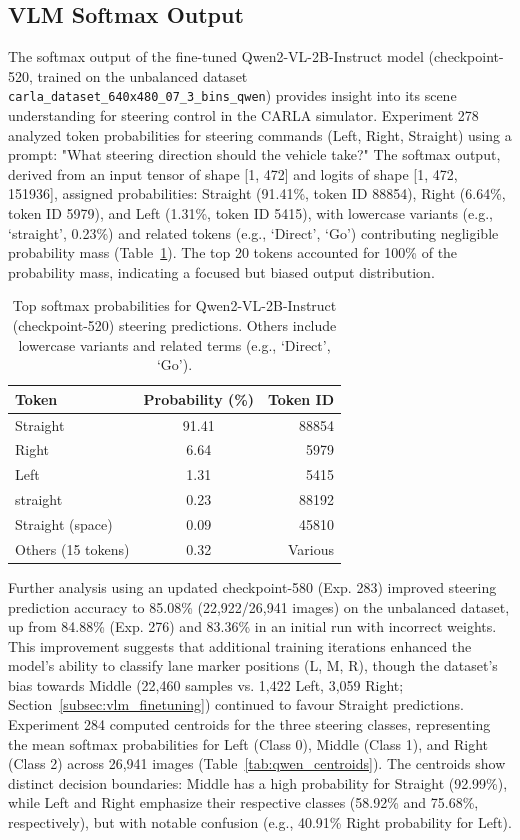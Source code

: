\subsection{VLM Softmax Output}
\label{subsec:vlm_softmax}

The softmax output of the fine-tuned Qwen2-VL-2B-Instruct model (checkpoint-520, trained on the unbalanced dataset \texttt{carla\_dataset\_640x480\_07\_3\_bins\_qwen}) provides insight into its scene understanding for steering control in the CARLA simulator. Experiment 278 analyzed token probabilities for steering commands (Left, Right, Straight) using a prompt: "What steering direction should the vehicle take?" The softmax output, derived from an input tensor of shape [1, 472] and logits of shape [1, 472, 151936], assigned probabilities: Straight (91.41\%, token ID 88854), Right (6.64\%, token ID 5979), and Left (1.31\%, token ID 5415), with lowercase variants (e.g., `straight', 0.23\%) and related tokens (e.g., `Direct', `Go') contributing negligible probability mass (Table~\ref{tab:qwen_softmax}). The top 20 tokens accounted for 100\% of the probability mass, indicating a focused but biased output distribution.

\begin{table}[ht]
\centering
\begin{tabular}{@{}lcr@{}}
\toprule
Token & Probability (\%) & Token ID \\
\midrule
Straight & 91.41 & 88854 \\
Right & 6.64 & 5979 \\
Left & 1.31 & 5415 \\
straight & 0.23 & 88192 \\
Straight (space) & 0.09 & 45810 \\
Others (15 tokens) & 0.32 & Various \\
\bottomrule
\end{tabular}
\caption{Top softmax probabilities for Qwen2-VL-2B-Instruct (checkpoint-520) steering predictions. Others include lowercase variants and related terms (e.g., `Direct', `Go').}
\label{tab:qwen_softmax}
\end{table}

Further analysis using an updated checkpoint-580 (Exp. 283) improved steering prediction accuracy to 85.08\% (22,922/26,941 images) on the unbalanced dataset, up from 84.88\% (Exp. 276) and 83.36\% in an initial run with incorrect weights. This improvement suggests that additional training iterations enhanced the model’s ability to classify lane marker positions (L, M, R), though the dataset’s bias towards Middle (22,460 samples vs. 1,422 Left, 3,059 Right; Section~\ref{subsec:vlm_finetuning}) continued to favour Straight predictions. Experiment 284 computed centroids for the three steering classes, representing the mean softmax probabilities for Left (Class 0), Middle (Class 1), and Right (Class 2) across 26,941 images (Table~\ref{tab:qwen_centroids}). The centroids show distinct decision boundaries: Middle has a high probability for Straight (92.99\%), while Left and Right emphasize their respective classes (58.92\% and 75.68\%, respectively), but with notable confusion (e.g., 40.91\% Right probability for Left).

